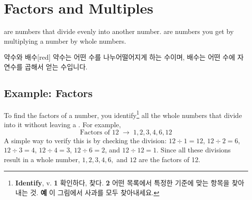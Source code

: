 \documentclass[12pt]{book}
\begin{document}










  \twosidedpaper
  \section{Factors and Multiples}
  \label{sec:factors_and_multiples}
   are numbers that divide evenly into another number.
   are numbers you get by multiplying a number by whole numbers.
  \begin{flexbox}{약수와 배수}[red]
    약수는 어떤 수를 나누어떨어지게 하는 수이며, 배수는 어떤 수에 자연수를 곱해서 얻는 수입니다.
  \end{flexbox}

  \subsection*{Example: Factors}
  To find the factors of a number, you identify\footnote{
    \textbf{Identify}, v. \textbf{1} 확인하다, 찾다. \textbf{2} 어떤 목록에서 특정한 기준에 맞는 항목을 찾아내는 것.
    \textbf{예} 이 그림에서 사과를 모두 찾아내세요.
  } all the whole numbers that divide into it without leaving a . For example,
  \[
    \text{Factors of } 12 \;\rightarrow\; 1, 2, 3, 4, 6, 12
  \]
  A simple way to verify this is by checking the division: $12 \div 1 = 12$, $12 \div 2 = 6$, $12 \div 3 = 4$, $12 \div 4 = 3$, $12 \div 6 = 2$, and $12 \div 12 = 1$. Since all these divisions result in a whole number, $1, 2, 3, 4, 6,$ and $12$ are the factors of 12.
\end{document}
